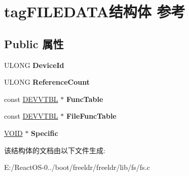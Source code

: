 \hypertarget{structtag_f_i_l_e_d_a_t_a}{}\section{tag\+F\+I\+L\+E\+D\+A\+T\+A结构体 参考}
\label{structtag_f_i_l_e_d_a_t_a}
\subsection*{Public 属性}
\begin{DoxyCompactItemize}
\item 
\mbox{\label{structtag_f_i_l_e_d_a_t_a_abcf5cf9192a1af0834d1cf5da05c75b2}} 
U\+L\+O\+NG {\bfseries Device\+Id}
\item 
\mbox{\label{structtag_f_i_l_e_d_a_t_a_a2e5b82b74a2af5432afd7d070eeee7ca}} 
U\+L\+O\+NG {\bfseries Reference\+Count}
\item 
\mbox{\label{structtag_f_i_l_e_d_a_t_a_a465bdee0d3f165e154f31fc0f9e161b0}} 
const \hyperlink{structtag_d_e_v_v_t_b_l}{D\+E\+V\+V\+T\+BL} $\ast$ {\bfseries Func\+Table}
\item 
\mbox{\label{structtag_f_i_l_e_d_a_t_a_a12c113aab7038691f0a2ce6efa11a10e}} 
const \hyperlink{structtag_d_e_v_v_t_b_l}{D\+E\+V\+V\+T\+BL} $\ast$ {\bfseries File\+Func\+Table}
\item 
\mbox{\label{structtag_f_i_l_e_d_a_t_a_aaa0826b5cc38bedbff629ae43adea5bc}} 
\hyperlink{interfacevoid}{V\+O\+ID} $\ast$ {\bfseries Specific}
\end{DoxyCompactItemize}


该结构体的文档由以下文件生成\+:\begin{DoxyCompactItemize}
\item 
E\+:/\+React\+O\+S-\/0../boot/freeldr/freeldr/lib/fs/fs.\+c\end{DoxyCompactItemize}
